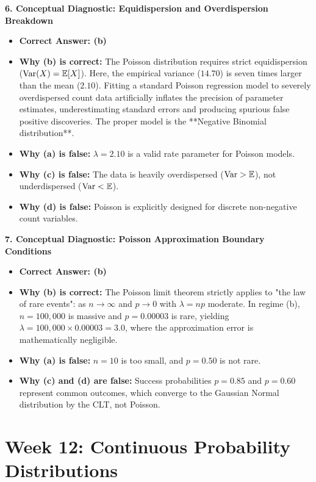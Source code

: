 \textbf{6. Conceptual Diagnostic: Equidispersion and Overdispersion Breakdown}
\begin{itemize}
    \item \textbf{Correct Answer: (b)}
    \item \textbf{Why (b) is correct:} The Poisson distribution requires strict equidispersion ($\operatorname{Var}(X) = \mathbb{E}[X]$). Here, the empirical variance ($14.70$) is seven times larger than the mean ($2.10$). Fitting a standard Poisson regression model to severely overdispersed count data artificially inflates the precision of parameter estimates, underestimating standard errors and producing spurious false positive discoveries. The proper model is the **Negative Binomial distribution**.
    \item \textbf{Why (a) is false:} $\lambda = 2.10$ is a valid rate parameter for Poisson models.
    \item \textbf{Why (c) is false:} The data is heavily overdispersed ($\operatorname{Var} > \mathbb{E}$), not underdispersed ($\operatorname{Var} < \mathbb{E}$).
    \item \textbf{Why (d) is false:} Poisson is explicitly designed for discrete non-negative count variables.
\end{itemize}

\textbf{7. Conceptual Diagnostic: Poisson Approximation Boundary Conditions}
\begin{itemize}
    \item \textbf{Correct Answer: (b)}
    \item \textbf{Why (b) is correct:} The Poisson limit theorem strictly applies to "the law of rare events": as $n \to \infty$ and $p \to 0$ with $\lambda = np$ moderate. In regime (b), $n = 100{,}000$ is massive and $p = 0.00003$ is rare, yielding $\lambda = 100{,}000 \times 0.00003 = 3.0$, where the approximation error is mathematically negligible.
    \item \textbf{Why (a) is false:} $n = 10$ is too small, and $p = 0.50$ is not rare.
    \item \textbf{Why (c) and (d) are false:} Success probabilities $p = 0.85$ and $p = 0.60$ represent common outcomes, which converge to the Gaussian Normal distribution by the CLT, not Poisson.
\end{itemize}


\section*{Week 12: Continuous Probability Distributions}

